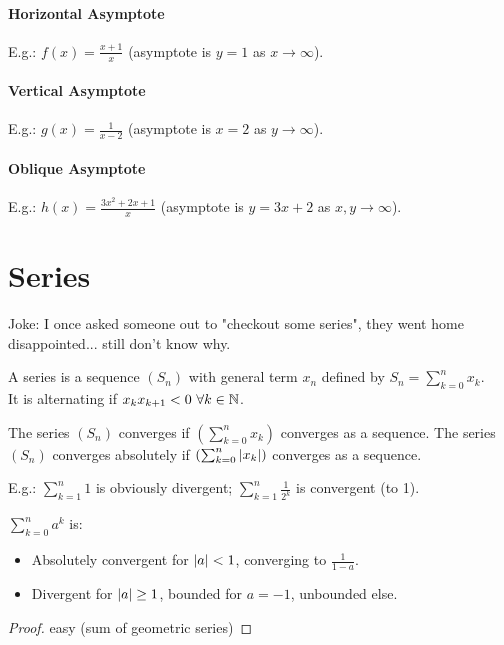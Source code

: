 \paragraph{Horizontal Asymptote}
E.g.: $f(x) = \frac{x+1}{x}$ (asymptote is $y=1$ as $x \to \infty$).
\paragraph{Vertical Asymptote}
E.g.: $g(x) = \frac{1}{x-2}$ (asymptote is $x=2$ as $y \to \infty$).
\paragraph{Oblique Asymptote}
E.g.: $h(x) = \frac{3x^2+2x+1}{x}$ (asymptote is $y=3x+2$ as $x,y \to \infty$).



\section{Series}
Joke: I once asked someone out to "checkout some series", they went home disappointed... still don't know why.
\begin{definition}[Series]
	A series is a sequence $(S_n)$ with general term $x_n$ defined by $S_n = \sum_{k=0}^{n} x_k$.\\
	It is alternating if $x_k x_{k+1} < 0 \ \forall k \in \N$.
\end{definition}
\begin{definition}
	The series $(S_n)$ converges if $\left( \sum_{k=0}^{n} x_k \right)$ converges as a sequence.
	The series $(S_n)$ converges absolutely if $\left( \sum_{k=0}^{n} | x_k | \right)$ converges as a sequence.
\end{definition}
E.g.: $\sum_{k=1}^n 1$ is obviously divergent;
$\sum_{k=1}^n \frac{1}{2^k}$ is convergent (to 1).

\begin{property}
	$\sum_{k=0}^n a^k$ is:
	\begin{itemize}
		\item Absolutely convergent for $| a | < 1$, converging to $\frac{1}{1-a}$.
		\item Divergent for $| a | \geq 1$, bounded for $a=-1$, unbounded else.
	\end{itemize}
\end{property}
\begin{proof}
	easy (sum of geometric series)
\end{proof}

